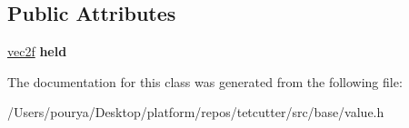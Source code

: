 \subsection*{Public Attributes}
\begin{DoxyCompactItemize}
\item 
\hypertarget{classps_1_1PRIVATE_1_1holder_3_01vec2f_01_4_a5d1a9e434bd8449f103cbb97713306aa}{}\hyperlink{classps_1_1base_1_1Vec2}{vec2f} {\bfseries held}\label{classps_1_1PRIVATE_1_1holder_3_01vec2f_01_4_a5d1a9e434bd8449f103cbb97713306aa}

\end{DoxyCompactItemize}


The documentation for this class was generated from the following file\+:\begin{DoxyCompactItemize}
\item 
/\+Users/pourya/\+Desktop/platform/repos/tetcutter/src/base/value.\+h\end{DoxyCompactItemize}
